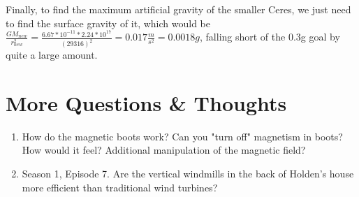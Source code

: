 \documentclass{amsart}
\theoremstyle{definition}
\begin{document}
Finally, to find the maximum artificial gravity of the smaller Ceres, we just need to find the surface gravity of it, which would be \(\frac{GM_{new}}{r_{new}^2}=\frac{6.67*10^{-11}*2.24*10^{17}}{(29316)^2} = 0.017\frac{m}{s^2} = 0.0018g\), falling short of the 0.3g goal by quite a large amount.

\section{More Questions \& Thoughts}
\begin{enumerate}
    \item How do the magnetic boots work? Can you "turn off" magnetism in boots?
    \subitem How would it feel? Additional manipulation of the magnetic field?
    
    \item Season 1, Episode 7. Are the vertical windmills in the back of Holden's house more efficient than traditional wind turbines?
    

\end{enumerate}
\end{document}

